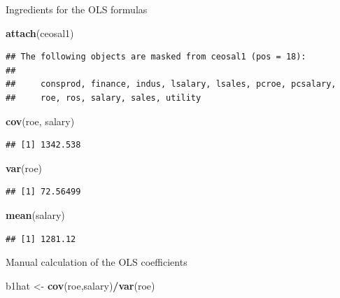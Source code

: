 \documentclass[]{book}
\newenvironment{Shaded}{\begin{snugshade}}{\end{snugshade}}
\newcommand{\KeywordTok}[1]{\textcolor[rgb]{0.13,0.29,0.53}{\textbf{#1}}}
\newcommand{\NormalTok}[1]{#1}
\newcommand{\OperatorTok}[1]{\textcolor[rgb]{0.81,0.36,0.00}{\textbf{#1}}}
\newcommand{\StringTok}[1]{\textcolor[rgb]{0.31,0.60,0.02}{#1}}
\begin{document}
Ingredients for the OLS formulas

\begin{Shaded}
\begin{Highlighting}[]
\KeywordTok{attach}\NormalTok{(ceosal1)}
\end{Highlighting}
\end{Shaded}

\begin{verbatim}
## The following objects are masked from ceosal1 (pos = 18):
## 
##     consprod, finance, indus, lsalary, lsales, pcroe, pcsalary,
##     roe, ros, salary, sales, utility
\end{verbatim}

\begin{Shaded}
\begin{Highlighting}[]
\KeywordTok{cov}\NormalTok{(roe, salary)}
\end{Highlighting}
\end{Shaded}

\begin{verbatim}
## [1] 1342.538
\end{verbatim}

\begin{Shaded}
\begin{Highlighting}[]
\KeywordTok{var}\NormalTok{(roe)}
\end{Highlighting}
\end{Shaded}

\begin{verbatim}
## [1] 72.56499
\end{verbatim}

\begin{Shaded}
\begin{Highlighting}[]
\KeywordTok{mean}\NormalTok{(salary)}
\end{Highlighting}
\end{Shaded}

\begin{verbatim}
## [1] 1281.12
\end{verbatim}

Manual calculation of the OLS coefficients

\begin{Shaded}
\begin{Highlighting}[]
\NormalTok{b1hat <-}\StringTok{ }\KeywordTok{cov}\NormalTok{(roe,salary)}\OperatorTok{/}\KeywordTok{var}\NormalTok{(roe)}
\end{Highlighting}
\end{Shaded}
\end{document}
